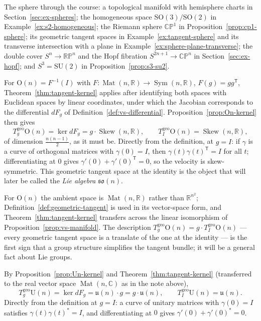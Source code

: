 \documentclass[11pt]{report}
\makeatletter
\newcounter{excounter}[section]
\newcommand{\exlabel}[1]{\edef\@currentlabel{\arabic{section}.\arabic{excounter}}\label{#1}}
\newcommand{\Ogp}{\mathrm{O}}
\newcommand{\SO}{\mathrm{SO}}
\newcommand{\Ugp}{\mathrm{U}}
\DeclareMathOperator{\Mat}{Mat}
\DeclareMathOperator{\Sym}{Sym}
\DeclareMathOperator{\Skew}{Skew}
\newcommand{\geo}{\mathrm{geo}}
\makeatother
\begin{document}
The sphere through the course: a topological manifold with hemisphere charts in Section~\ref{sec:ex-spheres}; the homogeneous space $\SO(3)/\SO(2)$ in Example~\ref{ex:s2-homogeneous}; the Riemann sphere $\mathbb{CP}^1$ in Proposition~\ref{prop:cp1-sphere}; its geometric tangent spaces in Example~\ref{ex:tangent-sphere} and its transverse intersection with a plane in Example~\ref{ex:sphere-plane-transverse}; the double cover $S^n \to \mathbb{RP}^n$ and the Hopf fibration $S^{2n+1} \to \mathbb{CP}^n$ in Section~\ref{sec:ex-hopf}; and $S^3 = \mathrm{SU}(2)$ in Proposition~\ref{prop:s3-su2}.


\begin{exbox}\exlabel{ex:tangent-On}
For $\Ogp(n) = F^{-1}(I)$ with $F : \Mat(n,\mathbb{R}) \to \Sym(n,\mathbb{R})$, $F(g) = gg^{\mathsf T}$, Theorem~\ref{thm:tangent-kernel} applies after identifying both spaces with Euclidean spaces by linear coordinates, under which the Jacobian corresponds to the differential $dF_g$ of Definition~\ref{def:vs-differential}. Proposition~\ref{prop:On-kernel} then gives
\[
T^{\geo}_g\Ogp(n) = \ker dF_g = g \cdot \Skew(n,\mathbb{R}), \qquad T^{\geo}_I \Ogp(n) = \Skew(n,\mathbb{R}),
\]
of dimension $\tfrac{n(n-1)}{2}$, as it must be. Directly from the definition, at $g = I$: if $\gamma$ is a curve of orthogonal matrices with $\gamma(0) = I$, then $\gamma(t)\gamma(t)^{\mathsf T} = I$ for all $t$; differentiating at $0$ gives $\gamma'(0) + \gamma'(0)^{\mathsf T} = 0$, so the velocity is skew-symmetric. This geometric tangent space at the identity is the object that will later be called the \emph{Lie algebra} $\mathfrak{so}(n)$.
\end{exbox}

\begin{rembox}\label{rem:tangent-5}
For $\Ogp(n)$ the ambient space is $\Mat(n,\mathbb{R})$ rather than $\mathbb{R}^{n^2}$; Definition~\ref{def:geometric-tangent} is used in its vector-space form, and Theorem~\ref{thm:tangent-kernel} transfers across the linear isomorphism of Proposition~\ref{prop:vs-manifold}. The description $T^{\geo}_g\Ogp(n) = g \cdot T^{\geo}_I\Ogp(n)$ --- every geometric tangent space is a translate of the one at the identity --- is the first sign that a group structure simplifies the tangent bundle; it will be a general fact about Lie groups.
\end{rembox}

\begin{exbox}\exlabel{ex:tangent-Un}
By Proposition~\ref{prop:Un-kernel} and Theorem~\ref{thm:tangent-kernel} (transferred to the real vector space $\Mat(n,\mathbb{C})$ as in the note above),
\[
T^{\geo}_g\Ugp(n) = \ker dF_g = \mathfrak{u}(n)\cdot g = g\cdot\mathfrak{u}(n), \qquad T^{\geo}_I\Ugp(n) = \mathfrak{u}(n).
\]
Directly from the definition at $g = I$: a curve of unitary matrices with $\gamma(0) = I$ satisfies $\gamma(t)\gamma(t)^* = I$, and differentiating at $0$ gives $\gamma'(0) + \gamma'(0)^* = 0$.
\end{exbox}
\end{document}
